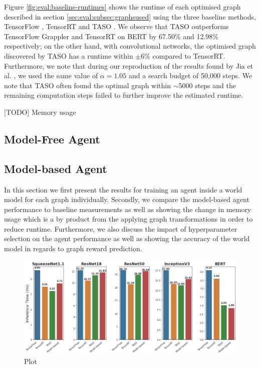 Figure \ref{fig:eval:baseline-runtimes} shows the runtime of each optimised graph described in section \ref{sec:eval:subsec:graphsused} using the three baseline methods, TensorFlow \cite{tensorflow2015-whitepaper}, TensorRT \cite{tensorrt2017} and TASO \cite{jia2019taso}. We observe that TASO outperforms TensorFlow Grappler and TensorRT on BERT by 67.50\% and 12.98\% respectively; on the other hand, with convolutional networks, the optimised graph discovered by TASO has a runtime within $\pm 6$\% compared to TensorRT. Furthermore, we note that during our reproduction of the results found by Jia et al. \cite{jia2019taso}, we used the same value of $\alpha = 1.05$ and a search budget of 50,000 steps. We note that TASO often found the optimal graph within $\sim$5000 steps and the remaining computation steps failed to further improve the estimated runtime.

[TODO] Memory usage


\subsection{Model-Free Agent}
\label{sec:eval:subsec:mfagent}

\subsection{Model-based Agent}
\label{sec:eval:subsec:mbagent}

In this section we first present the results for training an agent inside a world model for each graph individually. Secondly, we compare the model-based agent performance to baseline measurements as well as showing the change in memory usage which is a by product from the applying graph transformations in order to reduce runtime. Furthermore, we also discuss the impact of hyperparameter selection on the agent performance as well as showing the accuracy of the world model in regards to graph reward prediction.

\begin{figure}[ht]
  \centering
  \includegraphics[width=1\columnwidth]{sections/5evaluation/images/runtimes_mb.png}
  \caption[Runtime of optimised graphs using model-based RL]{Plot}
  \label{fig:eval:world-model-runtimes}
\end{figure}

